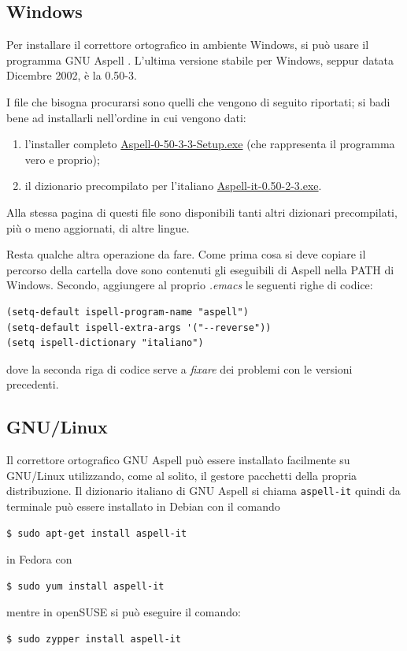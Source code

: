 \documentclass[11pt,a4paper]{article}
\begin{document}
\subsection{Windows}
\label{sec:aspellwin}
Per installare il correttore ortografico in ambiente Windows, si può
usare il programma GNU Aspell
. L'ultima
versione stabile per Windows, seppur datata Dicembre 2002, è la 0.50-3.

I file che bisogna procurarsi sono quelli che vengono di seguito
riportati; si badi bene ad installarli nell'ordine in cui vengono
dati:

\begin{enumerate}
\item l'installer completo
  \href{http://ftp.gnu.org/gnu/aspell/w32/Aspell-0-50-3-3-Setup.exe}%
  {Aspell-0-50-3-3-Setup.exe} (che rappresenta il programma
  vero e proprio);
\item il dizionario precompilato per l'italiano
  \href{http://ftp.gnu.org/gnu/aspell/w32/Aspell-it-0.50-2-3.exe}%
  {Aspell-it-0.50-2-3.exe}.
\end{enumerate}

Alla stessa pagina di questi file sono disponibili tanti altri
dizionari precompilati, più o meno aggiornati, di altre lingue.

Resta qualche altra operazione da fare. Come prima cosa si deve
copiare il percorso della cartella dove sono contenuti gli eseguibili
di Aspell nella \textsf{PATH} di Windows. Secondo, aggiungere al
proprio \emph{.emacs} le seguenti righe di codice:

\begin{Verbatim}
(setq-default ispell-program-name "aspell")
(setq-default ispell-extra-args '("--reverse"))
(setq ispell-dictionary "italiano")
\end{Verbatim}
dove la seconda riga di codice serve a \emph{fixare} dei problemi con
le versioni precedenti.

\subsection{GNU/Linux}
\label{sec:aspelllinux}

Il correttore ortografico GNU Aspell può essere installato facilmente
su GNU/Linux utilizzando, come al solito, il gestore pacchetti della
propria distribuzione. Il dizionario italiano di GNU Aspell si chiama
\texttt{aspell-it} quindi da terminale può essere installato in Debian
con il comando
\begin{Verbatim}
$ sudo apt-get install aspell-it
\end{Verbatim}
in Fedora con
\begin{Verbatim}
$ sudo yum install aspell-it
\end{Verbatim}
mentre in openSUSE si può eseguire il comando:
\begin{Verbatim}
$ sudo zypper install aspell-it
\end{Verbatim}
\end{document}
